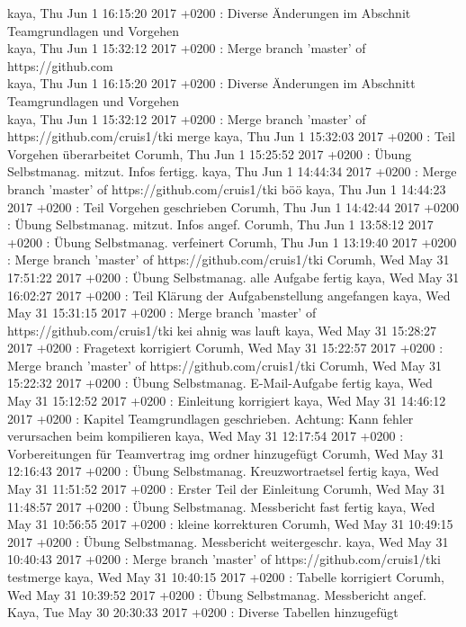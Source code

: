 
kaya, Thu Jun 1 16:15:20 2017 +0200 : Diverse Änderungen im Abschnit Teamgrundlagen und Vorgehen \\
kaya, Thu Jun 1 15:32:12 2017 +0200 : Merge branch 'master' of https://github.com \\
kaya, Thu Jun 1 16:15:20 2017 +0200 : Diverse Änderungen im Abschnitt Teamgrundlagen und Vorgehen\\
kaya, Thu Jun 1 15:32:12 2017 +0200 : Merge branch 'master' of https://github.com/cruis1/tki merge
kaya, Thu Jun 1 15:32:03 2017 +0200 : Teil Vorgehen überarbeitet
Corumh, Thu Jun 1 15:25:52 2017 +0200 : Übung Selbstmanag. mitzut. Infos fertigg.
kaya, Thu Jun 1 14:44:34 2017 +0200 : Merge branch 'master' of https://github.com/cruis1/tki böö
kaya, Thu Jun 1 14:44:23 2017 +0200 : Teil Vorgehen geschrieben
Corumh, Thu Jun 1 14:42:44 2017 +0200 : Übung Selbstmanag. mitzut. Infos angef.
Corumh, Thu Jun 1 13:58:12 2017 +0200 : Übung Selbstmanag. verfeinert
Corumh, Thu Jun 1 13:19:40 2017 +0200 : Merge branch 'master' of https://github.com/cruis1/tki
Corumh, Wed May 31 17:51:22 2017 +0200 : Übung Selbstmanag. alle Aufgabe fertig
kaya, Wed May 31 16:02:27 2017 +0200 : Teil Klärung der Aufgabenstellung angefangen
kaya, Wed May 31 15:31:15 2017 +0200 : Merge branch 'master' of https://github.com/cruis1/tki kei ahnig was lauft
kaya, Wed May 31 15:28:27 2017 +0200 : Fragetext korrigiert
Corumh, Wed May 31 15:22:57 2017 +0200 : Merge branch 'master' of https://github.com/cruis1/tki
Corumh, Wed May 31 15:22:32 2017 +0200 : Übung Selbstmanag. E-Mail-Aufgabe fertig
kaya, Wed May 31 15:12:52 2017 +0200 : Einleitung korrigiert
kaya, Wed May 31 14:46:12 2017 +0200 : Kapitel Teamgrundlagen geschrieben. Achtung: Kann fehler verursachen beim kompilieren
kaya, Wed May 31 12:17:54 2017 +0200 : Vorbereitungen für Teamvertrag img ordner hinzugefügt
Corumh, Wed May 31 12:16:43 2017 +0200 : Übung Selbstmanag. Kreuzwortraetsel fertig
kaya, Wed May 31 11:51:52 2017 +0200 : Erster Teil der Einleitung
Corumh, Wed May 31 11:48:57 2017 +0200 : Übung Selbstmanag. Messbericht fast fertig
kaya, Wed May 31 10:56:55 2017 +0200 : kleine korrekturen
Corumh, Wed May 31 10:49:15 2017 +0200 : Übung Selbstmanag. Messbericht weitergeschr.
kaya, Wed May 31 10:40:43 2017 +0200 : Merge branch 'master' of https://github.com/cruis1/tki testmerge
kaya, Wed May 31 10:40:15 2017 +0200 : Tabelle korrigiert
Corumh, Wed May 31 10:39:52 2017 +0200 : Übung Selbstmanag. Messbericht angef.
Kaya, Tue May 30 20:30:33 2017 +0200 : Diverse Tabellen hinzugefügt
